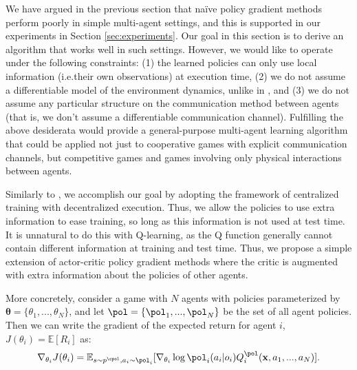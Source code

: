 We have argued in the previous section %
that na{\"i}ve policy gradient methods perform poorly in simple multi-agent settings, and this is supported in our experiments in Section \ref{sec:experiments}. Our goal in this section is to derive an algorithm that works well %
in such settings. However, we would like to operate under the following constraints: (1) the learned policies can only use local information (i.e.\@ their own observations) at execution time, (2) we do not assume a differentiable model of the environment dynamics, unlike in \cite{mordatch2017emergence}, %
and (3) we do not assume any particular structure on the communication method between agents (that is, we don't assume a differentiable communication channel). Fulfilling the above desiderata would provide a general-purpose multi-agent learning algorithm that could be applied not just to cooperative games with explicit communication channels, but competitive games and games involving only physical interactions between agents.


Similarly to \cite{foerster16b}, we accomplish our goal by adopting the framework of centralized training with decentralized execution. Thus, we allow the policies to use extra information to ease training, so long as this information is not used at test time. It is unnatural to do this with Q-learning, as the Q function generally cannot contain different information at training and test time. Thus, we propose a simple extension of actor-critic policy gradient methods where the critic is augmented with extra information about the policies of other agents. %


More concretely, consider a game with $N$ agents with policies parameterized by $\pmb{\theta} = \{\theta_1, ..., \theta_N\}$, and let $\pol = \{\pol_1, ..., \pol_N\}$ be the set of all agent policies. Then we can write the gradient of the expected return for agent $i$, $J(\theta_i) = \mathbb{E}[R_i]$ as:
\begin{equation}
\nabla_{\theta_i} J(\theta_i) = \mathbb{E}_{s\sim p^{\cpol},a_i \sim \pol_i} [\nabla_{\theta_i} \log \pol_i(a_i|o_i) Q^{\pol}_i (\mathbf{x},a_1, ..., a_N)]. 
\end{equation}

